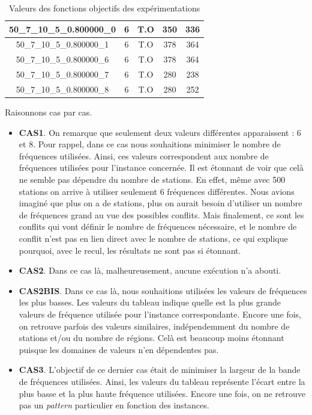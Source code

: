 \documentclass[a4paper, 10pt]{article}
\begin{document}
\begin{table}[!h]
\begin{tabular}{ |c|c|c|c|c| }
          \hline \hline
          \scriptsize{50\_7\_10\_5\_0.800000\_0} & 6 & \textcolor[gray]{0.6}{ T.O} &350  & 336 \\
          \hline
          \scriptsize{50\_7\_10\_5\_0.800000\_1} & 6 & \textcolor[gray]{0.6}{ T.O} & 378 & 364 \\
          \hline
          \scriptsize{50\_7\_10\_5\_0.800000\_6} & 6 & \textcolor[gray]{0.6}{ T.O} & 378 & 364 \\
          \hline
          \scriptsize{50\_7\_10\_5\_0.800000\_7} & 6 & \textcolor[gray]{0.6}{ T.O} & 280 &  238\\
          \hline
          \scriptsize{50\_7\_10\_5\_0.800000\_8} & 6 & \textcolor[gray]{0.6}{ T.O }&280 & 252 \\
          \hline
          \end{tabular}
          \caption{Valeurs des fonctions objectifs des expérimentations}
        \end{table}
        \newpage

        Raisonnons cas par cas.
        \begin{itemize}
          \item \textbf{CAS1}. On remarque que seulement deux valeurs différentes apparaissent : $6$ et $8$. Pour rappel, dans ce cas nous souhaitions minimiser le nombre de fréquences utilisées. Ainsi, ces valeurs correspondent aux nombre de fréquences utilisées pour l'instance concernée.
          Il est étonnant de voir que celà ne semble pas dépendre du nombre de stations. En effet, même avec 500 stations on arrive à utiliser seulement $6$ fréquences différentes. Nous avions imaginé que plus on a de stations, plus on aurait besoin d'utiliser un nombre de fréquences grand au vue des possibles conflits. Mais finalement, ce sont les conflits qui vont définir le nombre de fréquences nécessaire, et le nombre de conflit n'est pas en lien direct avec le nombre de stations, ce qui explique pourquoi, avec le recul, les résultats ne sont pas si étonnant.
          \item \textbf{CAS2}. Dans ce cas là, malheureusement, aucune exécution n'a abouti.
          \item \textbf{CAS2BIS}. Dans ce cas là, nous souhaitions utilisées les valeurs de fréquences les plus basses. Les valeurs du tableau indique quelle est la plus grande valeurs de fréquence utilisée pour l'instance correspondante. Encore une fois, on retrouve parfois des valeurs similaires, indépendemment du nombre de stations et/ou du nombre de régions. Celà est beaucoup moins étonnant puisque les domaines de valeurs n'en dépendentes pas.
          \item \textbf{CAS3}. L'objectif de ce dernier cas était de minimiser la largeur de la bande de fréquences utilisées. Ainsi, les valeurs du tableau représente l'écart entre la plus basse et la plus haute fréquence utilisées. Encore une fois, on ne retrouve pas un \textit{pattern} particulier en fonction des instances.
        \end{itemize}
\end{document}
